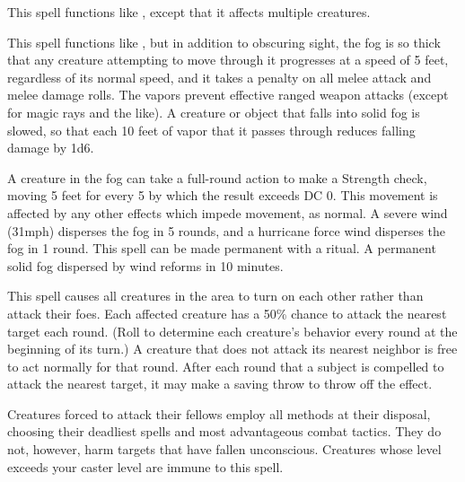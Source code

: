 \spelleffect This spell functions like , except that it affects multiple creatures.

\spelldur{\durmed}
\spelleffect This spell functions like , but in addition to obscuring sight, the fog is so thick that any creature attempting to move through it progresses at a speed of 5 feet, regardless of its normal speed, and it takes a  penalty on all melee attack and melee damage rolls. The vapors prevent effective ranged weapon attacks (except for magic rays and the like). A creature or object that falls into solid fog is slowed, so that each 10 feet of vapor that it passes through reduces falling damage by 1d6.
\par A creature in the fog can take a full-round action to make a Strength check, moving 5 feet for every 5 by which the result exceeds DC 0. This movement is affected by any other effects which impede movement, as normal.
\spellnotes A severe wind (31\add mph) disperses the fog in 5 rounds, and a hurricane force wind disperses the fog in 1 round. This spell can be made permanent with a  ritual. A permanent solid fog dispersed by wind reforms in 10 minutes.

\spelldur{\durshort}
\spelleffect This spell causes all creatures in the area to turn on each other rather than attack their foes. Each affected creature has a 50\% chance to attack the nearest target each round. (Roll to determine each creature's behavior every round at the beginning of its turn.) A creature that does not attack its nearest neighbor is free to act normally for that round. After each round that a subject is compelled to attack the nearest target, it may make a saving throw to throw off the effect.
\par Creatures forced to attack their fellows employ all methods at their disposal, choosing their deadliest spells and most advantageous combat tactics. They do not, however, harm targets that have fallen unconscious.
\spellnotes Creatures whose level exceeds your caster level are immune to this spell.

